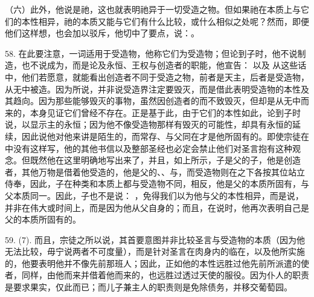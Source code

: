 （六）此外，他说是祂，这也就表明祂异于一切受造之物。但如果祂在本质上与它们的本性相异，祂的本质又能与它们有什么比较，或什么相似之处呢？然而，即便他们这样想，也会加以驳斥，他切中了要点，说：。\par

58. 在此要注意，一词适用于受造物，他称它们为受造物；但论到子时，他不说制造，也不说成为，而是论及永恒、王权与创造者的职能，他宣告： 以及 从这些话中，他们若愿意，就能看出创造者不同于受造之物，前者是天主，后者是受造物，从无中被造。因为所说，并非说受造界注定要毁灭，而是借此表明受造物的本性及其趋向。因为那些能够毁灭的事物，虽然因创造者的而不致毁灭，但却是从无中而来的，本身见证它们曾经不存在。正是基于此，由于它们的本性如此，论到子时说，以显示主的永恒；因为他不像受造物那样有毁灭的可能性，却具有永恒的延续，因此说他对他来讲是陌生的，而常存、与父同在才是他所固有的。即使宗徒在  中没有这样写，他的其他书信以及整部圣经也必定会禁止他们对圣言抱有这种观念。但既然他在这里明确地写出来了，并且，如上所示，子是父的子，他是创造者，其他万物是借着他受造的，他是父的、、与，而受造物则在之下各按其位站立侍奉，因此，子在种类和本质上都与受造物不同，相反，他是父的本质所固有，与父本质同一。因此，子也不是说： ，免得我们以为他与父的本性相异，而是说，并非在伟大或时间上，而是因为他从父自身的；而且，在说时，他再次表明自己是父的本质所固有的。\par

59. (7). 而且，宗徒之所以说，其首要意图并非比较圣言与受造物的本质（因为他无法比较，毋宁说两者不可度量），而是针对圣言在肉身内的临在，以及他所实施的，他要表明他并不像先前那班人；因此，正如他的本性远胜过他先前所派遣的使者，同样，由他而来并借着他而来的，也远胜过透过天使的服役。因为仆人的职责是要求果实，仅此而已；而儿子兼主人的职责则是免除债务，并移交葡萄园。\par

